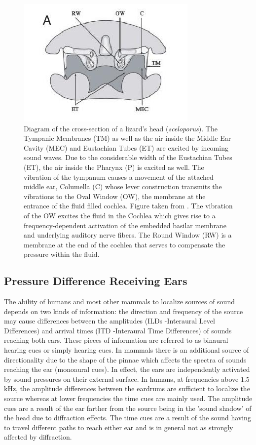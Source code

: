 \documentclass[12pt]{book}
\begin{document}
\begin{figure}[ht]
 \centering
 \includegraphics[width=0.45\linewidth]{Diagrams/lizardheadcrosssection.jpeg}
 \caption[Cross Section of a Lizards Head]{Diagram of the cross-section of a lizard’s head (\emph{sceloporus}). The Tympanic Membranes (TM) as well as
 the air inside the Middle Ear Cavity (MEC) and Eustachian Tubes (ET) are excited by incoming sound waves. Due to the considerable width of the Eustachian Tubes (ET), the air inside the Pharynx (P) is excited as well.
 The vibration of the tympanum causes a movement of the attached middle ear, Columella (C) whose lever construction transmits the vibrations to the Oval Window (OW), the membrane at the entrance of the fluid filled cochlea.
 Figure taken from \cite{dalsgaardmanley1}. The vibration of the OW excites the fluid in the Cochlea which gives rise to a frequency-dependent activation of the embedded basilar membrane and underlying
 auditory nerve fibers. The Round Window (RW) is a membrane at the end of the cochlea that serves to compensate the pressure within the fluid.}
 \label{lizardheadcrosssection}
\end{figure}

\subsection{Pressure Difference Receiving Ears}\label{iceintrosection}
The ability of humans and most other mammals to localize sources of sound depends on two kinds of information: the direction and frequency
of the source may cause differences between the amplitudes (ILDs -Interaural Level Differences) and arrival times (ITD -Interaural Time Differences) of sounds reaching both ears. These pieces of information are
referred to as binaural hearing cues or simply hearing cues. In mammals there is an additional source of directionality due to the shape
of the pinnae which affects the spectra of sounds reaching the ear (monoaural cues). In effect, the ears are independently activated by sound pressures
on their external surface. In humans, at frequencies above $1.5$kHz, the amplitude differences between the eardrums are sufficient
to localize the source whereas at lower frequencies the time cues are mainly used. The amplitude cues are a result of the ear farther
from the source being in the 'sound shadow' of the head due to diffraction effects. The time cues are a result of the sound having to travel
different paths to reach either ear and is in general not as strongly affected by diffraction.
\end{document}
